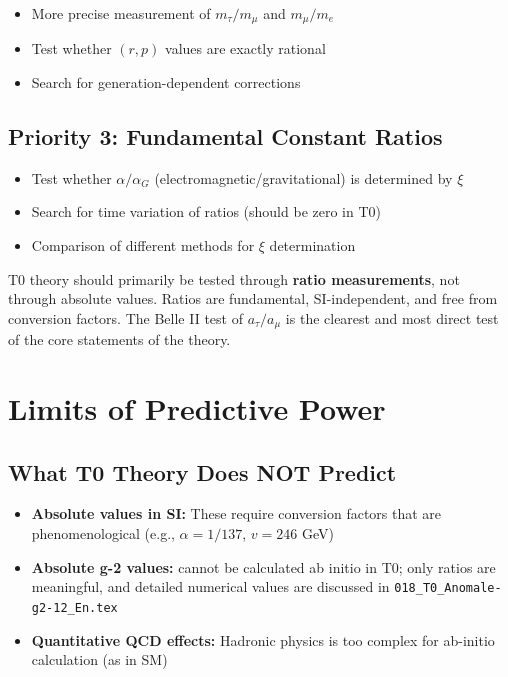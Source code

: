 \begin{itemize}
	\item More precise measurement of $m_\tau/m_\mu$ and $m_\mu/m_e$
	\item Test whether $(r,p)$ values are exactly rational
	\item Search for generation-dependent corrections
\end{itemize}

\subsection{Priority 3: Fundamental Constant Ratios}

\begin{itemize}
	\item Test whether $\alpha/\alpha_G$ (electromagnetic/gravitational) is determined by $\xi$
	\item Search for time variation of ratios (should be zero in T0)
	\item Comparison of different methods for $\xi$ determination
\end{itemize}

\begin{keypoint}
	T0 theory should primarily be tested through \textbf{ratio measurements}, not through absolute values. Ratios are fundamental, SI-independent, and free from conversion factors. The Belle II test of $a_\tau/a_\mu$ is the clearest and most direct test of the core statements of the theory.
\end{keypoint}

\section{Limits of Predictive Power}

\subsection{What T0 Theory Does NOT Predict}

\begin{itemize}
	\item \textbf{Absolute values in SI:} These require conversion factors that are phenomenological (e.g., $\alpha = 1/137$, $v = 246$ GeV)
	
	\item \textbf{Absolute g-2 values:} cannot be calculated ab initio in T0; only ratios are meaningful, and detailed numerical values are discussed in \texttt{018\_T0\_Anomale-g2-12\_En.tex}
	
	\item \textbf{Quantitative QCD effects:} Hadronic physics is too complex for ab-initio calculation (as in SM)
\end{itemize}

